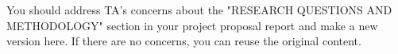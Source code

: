 You should address TA's concerns about the "RESEARCH QUESTIONS AND METHODOLOGY" section in your project proposal report and make a new version here. If there are no concerns, you can reuse the original content.